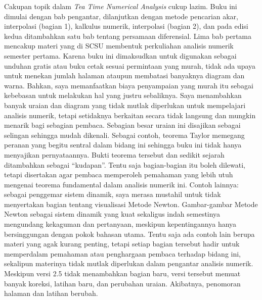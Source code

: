 Cakupan topik dalam \textit{Tea Time Numerical Analysis} cukup lazim.
Buku ini dimulai dengan bab pengantar, dilanjutkan dengan metode pencarian
akar, interpolasi (bagian 1), kalkulus numerik, interpolasi (bagian
2), dan pada edisi kedua ditambahkan satu bab tentang persamaan diferensial.
Lima bab pertama mencakup materi yang di SCSU membentuk perkuliahan
analisis numerik semester pertama. Karena buku ini dimaksudkan untuk
digunakan sebagai unduhan gratis atau buku cetak sesuai permintaan
yang murah, tidak ada upaya untuk menekan jumlah halaman ataupun membatasi
banyaknya diagram dan warna. Bahkan, saya memanfaatkan biaya penyampaian
yang murah itu sebagai kebebasan untuk melakukan hal yang justru sebaliknya.
Saya menambahkan banyak uraian dan diagram yang tidak mutlak diperlukan
untuk mempelajari analisis numerik, tetapi setidaknya berkaitan secara
tidak langsung dan mungkin menarik bagi sebagian pembaca. Sebagian
besar uraian ini disajikan sebagai selingan sehingga mudah dikenali.
Sebagai contoh, teorema Taylor memegang peranan yang begitu sentral
dalam bidang ini sehingga buku ini tidak hanya menyajikan pernyataannya.
Bukti teorema tersebut dan sedikit sejarah ditambahkan sebagai ``kudapan''.
Tentu saja bagian-bagian itu boleh dilewati, tetapi disertakan agar
pembaca memperoleh pemahaman yang lebih utuh mengenai teorema fundamental
dalam analisis numerik ini. Contoh lainnya: sebagai penggemar sistem
dinamik, saya merasa mustahil untuk tidak menyertakan bagian tentang
visualisasi Metode Newton. Gambar-gambar Metode Newton sebagai sistem
dinamik yang kuat sekaligus indah semestinya mengundang kekaguman
dan pertanyaan, meskipun kepentingannya hanya bersinggungan dengan
pokok bahasan utama. Tentu saja ada contoh lain berupa materi yang
agak kurang penting, tetapi setiap bagian tersebut hadir untuk memperdalam
pemahaman atau penghargaan pembaca terhadap bidang ini, sekalipun
materinya tidak mutlak diperlukan dalam pengantar analisis numerik.
Meskipun versi 2.5 tidak menambahkan bagian baru, versi tersebut memuat
banyak koreksi, latihan baru, dan perubahan uraian. Akibatnya, penomoran
halaman dan latihan berubah.

